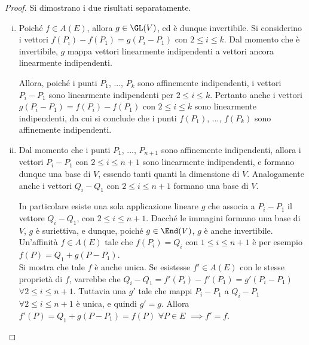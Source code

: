 \documentclass[11pt]{article}
\begin{document}
	\begin{proof}
		Si dimostrano i due risultati separatamente.
		
		\begin{enumerate}[(i)]
			\item Poiché $f \in A(E)$, allora $g \in \GL(V)$, ed è
			dunque invertibile. Si considerino i vettori $f(P_i) - f(P_1) = g(P_i - P_1)$
			con $2 \leq i \leq k$. Dal momento che è invertibile,
			$g$ mappa vettori linearmente indipendenti a vettori
			ancora linearmente indipendenti.
			
			Allora, poiché i punti
			$P_1$, ..., $P_k$ sono affinemente indipendenti, i
			vettori $P_i - P_1$ sono linearmente indipendenti per
			$2 \leq i \leq k$. Pertanto anche i vettori $g(P_i - P_1) = f(P_i) - f(P_1)$ con $2 \leq i \leq k$ sono linearmente indipendenti, da cui si conclude che i punti $f(P_1)$, ...,
			$f(P_k)$ sono affinemente indipendenti.
			
			\item Dal momento che i punti $P_1$, ..., $P_{n+1}$ sono
			affinemente indipendenti, allora i vettori $P_i - P_1$ con
			$2 \leq i \leq n+1$ sono linearmente indipendenti, e formano
			dunque una base di $V$, essendo tanti quanti la dimensione
			di $V$. Analogamente anche i vettori $Q_i - Q_1$ con $2 \leq i \leq n+1$ formano una base di $V$.

			In particolare esiste una sola applicazione lineare $g$ che
			associa a $P_i - P_1$ il vettore $Q_i - Q_1$, con $2 \leq i \leq n+1$. Dacché le immagini formano una base di $V$, $g$ è suriettiva,
			e dunque, poiché $g \in \End(V)$, $g$ è anche invertibile.
			Un'affinità $f \in A(E)$ tale che $f(P_i) = Q_i$ con $1 \leq i \leq n+1$ è per esempio $f(P) = Q_1 + g(P - P_1)$. \\
			
			Si mostra che tale $f$ è anche unica. Se esistesse $f' \in A(E)$
			con le stesse proprietà di $f$, varrebbe che $Q_i - Q_1 = f'(P_i) - f'(P_1) =  g'(P_i - P_1)$ $\forall 2 \leq i \leq n+1$. Tuttavia
			una $g'$ tale che mappi $P_i - P_1$ a $Q_i - P_1$ $\forall 2 \leq i \leq n+1$ è unica, e quindi $g' = g$. Allora $f'(P) = Q_1 + g(P - P_1) = f(P)$ $\forall P \in E$ $\implies f' = f$.
		\end{enumerate}
	\end{proof}
\end{document}
